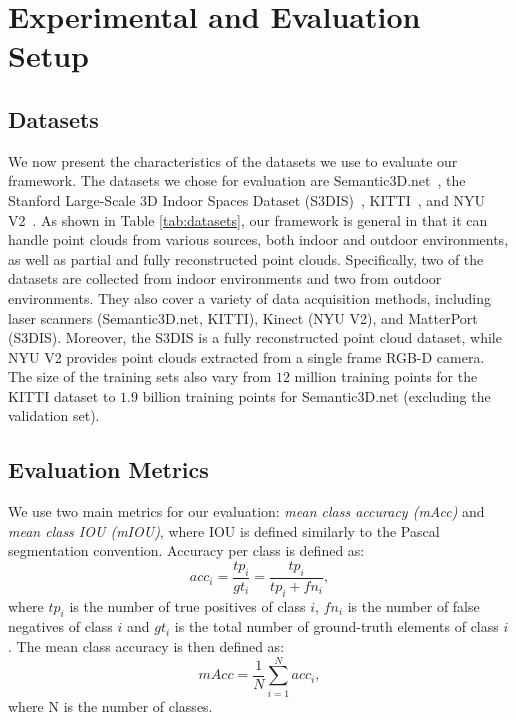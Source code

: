 \documentclass[10pt,twocolumn,letterpaper]{article}
\begin{document}
\vspace{5mm}
\section{Experimental and Evaluation Setup}\label{sec:setup}

\subsection{Datasets}\label{sec:appdx_datasets}
We now present the characteristics of the datasets we use to evaluate our framework. The datasets we chose for evaluation are Semantic3D.net~\cite{l3d}, the Stanford Large-Scale 3D Indoor Spaces Dataset (S3DIS)~\cite{Armeni2016}, KITTI~\cite{Geiger2013IJRR,Geiger:2012:WRA:2354409.2354978}, and NYU V2~\cite{Silberman:ECCV12}. As shown in Table \ref{tab:datasets}, our framework is general in that it can handle point clouds from various sources, both indoor and outdoor environments, as well as partial and fully reconstructed point clouds. Specifically, two of the datasets are collected from indoor environments and two from outdoor environments. They also cover a variety of data acquisition methods, including laser scanners (Semantic3D.net, KITTI), Kinect (NYU V2), and MatterPort (S3DIS). Moreover, the S3DIS is a fully reconstructed point cloud dataset, while NYU V2 provides point clouds extracted from a single frame RGB-D camera. The size of the training sets also vary from $12$ million training points for the KITTI dataset to $1.9$ billion training points for Semantic3D.net (excluding the validation set). 



\vspace{5mm}
\subsection{Evaluation Metrics} \label{sec:metrics}
We use two main metrics for our evaluation: \textit{mean class accuracy (mAcc)} and \textit{mean class IOU (mIOU)}, where IOU is defined similarly to the Pascal segmentation convention. Accuracy per class is defined as:
\begin{equation} \label{eq:acc}
    acc_i = \frac{tp_i}{gt_i} = \frac{tp_i}{tp_i + fn_i},
\end{equation}
where $tp_i$ is the number of true positives of class $i$, $fn_i$ is the number of false negatives of class $i$ and $gt_i$ is the total number of ground-truth elements of class $i$. The mean class accuracy is then defined as:
\begin{equation}
    mAcc = \frac{1}{N}\sum_{i=1}^{N}acc_i,
\end{equation}
where N is the number of classes.
\end{document}
